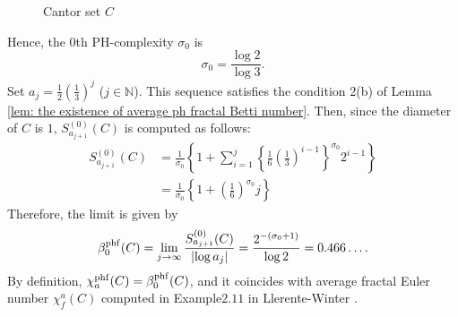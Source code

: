 \documentclass[12pt]{amsart}
\numberwithin{equation}{section}
\newcommand{\N}{\mathbb{N}}
\newcommand{\Q}{\mathbb{Q}}
\begin{document}
    \begin{figure}[hbt]
    \centering
    \caption{Cantor set $C$}
    \label{fig: Cantor set}
    \end{figure}
    Hence, the $0$th PH-complexity $\sigma_0$ is 
    \begin{equation*}
    \sigma_0 = \frac{\log 2}{\log 3}. 
    \end{equation*}
    Set $a_j = \frac{1}{2} \left( \frac{1}{3} \right)^j$ ($j\in \N$). 
    This sequence satisfies the condition 2(b) of Lemma \ref{lem: the existence of average ph fractal Betti number}. 
    Then, since the diameter of $C$ is $1$, $S_{a_{j+1}}^{(0)} (C)$ is computed as follows:
    \begin{align*}
    S_{a_{j+1}}^{(0)} (C) &= \frac{1}{\sigma_0}\left\{1 + \sum_{i=1}^{j} \left\{\frac{1}{6} \left(\frac{1}{3}\right)^{i-1}\right\}^{\sigma_0} 2^{i-1} \right\}\\
    &= \frac{1}{\sigma_0} \left\{ 1+ \left(\frac{1}{6}\right)^{\sigma_0} j \right\}
    \end{align*}
    Therefore, the limit is given by
    \begin{equation*}
        \beta_0^{\rm phf}(C) = \lim_{j \rightarrow \infty}\frac{S_{a_{j+1}}^{(0)}(C)}{ \left| \log a_j\right|} = \frac{2^{-(\sigma_0+1)}}{\log2} = 0.466\dots. 
    \end{equation*}
    By definition, $\chi_{a}^{\rm phf}(C) = \beta_0^{\rm phf} (C)$, and it coincides with average fractal Euler number $\chi_f^{a}(C)$ computed in Example$2.11$ in Llerente-Winter \cite{LW07}.
\end{document}
